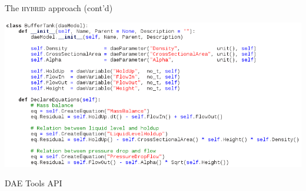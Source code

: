 \documentclass[compress,newPxFont,sthlmFooter]{beamer}
\begin{document}
\begin{frame}{The \textsc{hybrid} approach (cont'd)}
    \begin{center}
       \includegraphics[align=c, width=0.70\paperwidth]{daetools_model.png} \par
       {\scriptsize \textcolor{sthlmRed}{DAE Tools API}}
    \end{center}
\end{frame}
\end{document}

